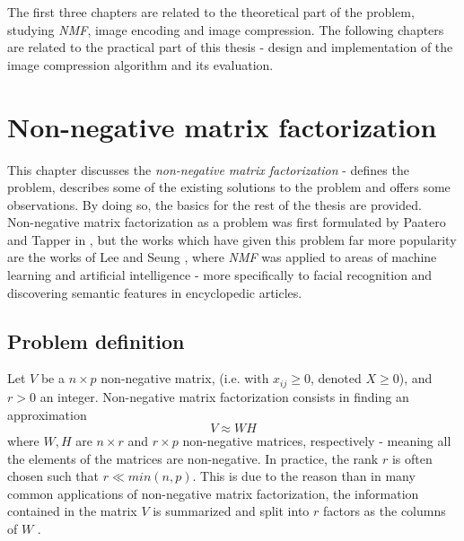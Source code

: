 \documentclass[thesis=M,english]{FITthesis}[2012/10/20]
\begin{document}
The first three chapters are related to the theoretical part of the problem, studying
\emph{NMF}, image encoding and image compression. The following chapters are related
to the practical part of this thesis - design and implementation of the image
compression algorithm and its evaluation.

%   
\chapter{Non-negative matrix factorization}
\label{ch:NMF}
This chapter discusses the \emph{non-negative matrix factorization} - defines
the problem, describes some of the existing solutions to the problem and
offers some observations. By doing so, the basics for the rest of the thesis are
provided.
\\

Non-negative matrix factorization as a problem was first formulated by Paatero
and Tapper in \cite{nmf-paatero}, but the works which have given
this problem far more popularity are the works of Lee and Seung \cite{lee99}, where
\emph{NMF} was applied to areas of machine learning and artificial
intelligence - more specifically to facial recognition and discovering semantic
features in encyclopedic articles.

\section{Problem definition}
Let $V$ be a $n \times p$ non-negative matrix, (i.e. with $x_{ij} \geq 0$, denoted
$X \geq 0$), and $r > 0$ an integer. Non-negative matrix factorization consists in
finding an approximation
\begin{equation}
  V \approx WH
\end{equation}
where $W, H$ are $n \times r$ and $r \times p$ non-negative matrices, respectively - meaning
all the elements of the matrices are non-negative.
In practice, the rank $r$ is often chosen such that $r \ll min(n,p)$. This is due
to the reason than in many common applications of non-negative matrix factorization,
the information contained in the matrix $V$ is summarized and split into $r$ factors
as the columns of $W$ \cite{nmf-r-vignette}.
\\
\end{document}

